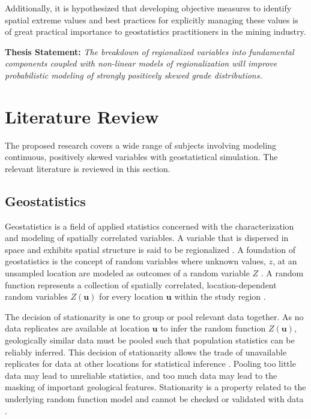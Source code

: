 Additionally, it is hypothesized that developing objective measures to identify spatial extreme values and best practices for explicitly managing these values is of great practical importance to geostatistics practitioners in the mining industry.


\begin{tcolorbox}
    \textbf{Thesis Statement:} \textit{The breakdown of regionalized variables into fundamental components coupled with non-linear models of regionalization will improve probabilistic modeling of strongly positively skewed grade distributions.}
\end{tcolorbox}



\FloatBarrier
\section{Literature Review}
\label{sec:01litreview}

The proposed research covers a wide range of subjects involving modeling continuous, positively skewed variables with geostatistical simulation. The relevant literature is reviewed in this section.

\FloatBarrier
\subsection{Geostatistics}
\label{subsec:01geostats}

Geostatistics is a field of applied statistics concerned with the characterization and modeling of spatially correlated variables. A variable that is dispersed in space and exhibits spatial structure is said to be regionalized \citep{matheron2019matheron}. A foundation of geostatistics is the concept of random variables where unknown values, $z$, at an unsampled location are modeled as outcomes of a random variable $Z$ \citep{deutsch1992geostatistical}. A random function represents a collection of spatially correlated, location-dependent random variables $Z(\mathbf{u})$ for every location $\mathbf{u}$ within the study region \citep{goovaerts1997geostatistics}.

The decision of stationarity is one to group or pool relevant data together. As no data replicates are available at location $\mathbf{u}$ to infer the random function $Z(\mathbf{u})$, geologically similar data must be pooled such that population statistics can be reliably inferred. This decision of stationarity allows the trade of unavailable replicates for data at other locations for statistical inference \citep{deutsch1992geostatistical}. Pooling too little data may lead to unreliable statistics, and too much data may lead to the masking of important geological features. Stationarity is a property related to the underlying random function model and cannot be checked or validated with data \citep{goovaerts1997geostatistics}.

